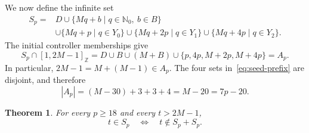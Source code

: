 \documentclass[11pt,letterpaper]{article}
\newtheorem{theorem}{Theorem}[section]
\newcommand{\Nzero}{\mathbb{N}_0}
\newcommand{\ints}[2]{[#1,#2]_{\mathbb{Z}}}
\begin{document}
We now define the infinite set
\begin{equation}\label{eq:S}
\begin{split}
S_p={}&D\cup\{Mq+b\mid q\in\Nzero,\ b\in B\}\\
&\cup\{Mq+p\mid q\in Y_0\}
 \cup\{Mq+2p\mid q\in Y_1\}
 \cup\{Mq+4p\mid q\in Y_2\}.
\end{split}
\end{equation}
The initial controller memberships give
\begin{equation}\label{eq:seed-prefix}
S_p\cap\ints{1}{2M-1}
=D\cup B\cup(M+B)\cup\{p,4p,M+2p,M+4p\}=A_p.
\end{equation}
In particular, \(2M-1=M+(M-1)\in A_p\). The four sets in~\eqref{eq:seed-prefix} are disjoint, and therefore
\begin{equation}\label{eq:seed-size}
|A_p|=(M-30)+3+3+4=M-20=7p-20.
\end{equation}

\begin{theorem}\label{thm:recurrence}
For every \(p\geq18\) and every \(t>2M-1\),
\begin{equation}\label{eq:main-recurrence}
t\in S_p
\quad\Longleftrightarrow\quad
t\notin S_p+S_p.
\end{equation}
\end{theorem}
\end{document}
